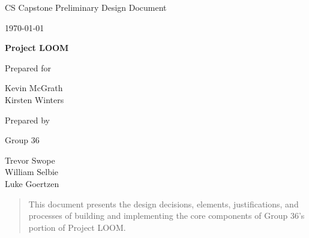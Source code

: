 \documentclass[onecolumn, draftclsnofoot,10pt, compsoc]{IEEEtran}
\def \CapstoneTeamName{     }
\def \CapstoneTeamNumber{       36}
\def \GroupMemberOne{           Trevor Swope}
\def \GroupMemberTwo{           William Selbie}
\def \GroupMemberThree{         Luke Goertzen}
\def \CapstoneProjectName{      Project LOOM}
\def \CapstoneSponsorPerson{    Chet Udell}
\def \DocType{  %
                Preliminary Design Document
                }
\newcommand{\NameSigPair}[1]{\par
\makebox[2.75in][r]{#1} \hfil   \makebox[3.25in]{\makebox[2.25in]{\hrulefill} \hfill        \makebox[.75in]{\hrulefill}}
\par\vspace{-12pt} \textit{\tiny\noindent
\makebox[2.75in]{} \hfil        \makebox[3.25in]{\makebox[2.25in][r]{Signature} \hfill  \makebox[.75in][r]{Date}}}}
\begin{document}
\begin{titlepage}
    \begin{singlespace}
        \hfill 
        \par\vspace{.2in}
        \centering
        \scshape{
            \huge CS Capstone \DocType \par
            {\large\today}\par
            \vspace{.5in}
            \textbf{\Huge\CapstoneProjectName}\par
            \vfill
            {\large Prepared for}\par
            \Huge Kevin McGrath \\ Kirsten Winters \par
            \vspace{5pt}
            {\large Prepared by }\par
            Group\CapstoneTeamNumber\par
            \CapstoneTeamName\par 
            \vspace{5pt}
            \GroupMemberOne \\
            \GroupMemberTwo \\
            \GroupMemberThree \\
            \vspace{20pt}
        }
        \begin{abstract}
            This document presents the design decisions, elements, justifications, and processes of building and implementing the core components of Group 36's portion of Project LOOM.
        \end{abstract}     
    \end{singlespace}
\end{titlepage}
\newpage
{}
\tableofcontents
\clearpage
\end{document}
